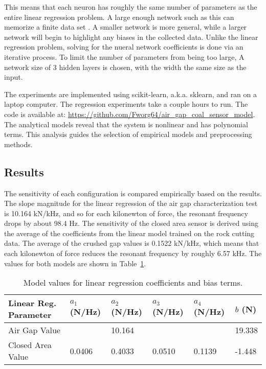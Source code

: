 This means that each neuron has roughly the same number of parameters as the entire linear regression problem.
A large enough network such as this can memorize a finite data set \cite{AroraBMM16}.
A smaller network is more general, while a larger network will begin to highlight any biases in the collected data.
Unlike the linear regression problem, solving for the nueral network coefficients is done via an iterative process.
To limit the number of parameters from being too large,
A network size of 3 hidden layers is chosen, with the width the same size as the input. 

The experiments are implemented using scikit-learn, a.k.a. sklearn, \cite{JMLR:v12:pedregosa11a} 
and ran on a laptop computer. The regression experiments take a couple hours to run.
The code is available at: \url{https://github.com/Fworg64/air_gap_coal_sensor_model}.
The analytical models reveal that the system is nonlinear and has polynomial terms.
This analysis guides the selection of empirical models and preprocessing methods.

\subsection{Results}

The sensitivity of each configuration is compared empirically based on the results.
The slope magnitude for the linear regression of the air gap characterization test is
10.164 kN/kHz, and so for each kilonewton of force, the resonant frequency drops by about
98.4 Hz. The sensitivity of the closed area sensor is derived using the average of the 
coefficients from the linear model trained on the rock cutting data.
The average of the crushed gap values is 0.1522 kN/kHz, which means that each kilonewton of force
reduces the resonant frequency by roughly 6.57 kHz.
The values for both models are shown in Table~\ref{tab:lin}. 

\begin{table}[b]
\centering
\caption{Model values for linear regression coefficients and bias terms.}
\label{tab:lin}
\begin{tabular}{|l|l|l|l|l|l|} 
\hline
Linear Reg. Parameter & $a_1$ (N/Hz) & $a_2$ (N/Hz) & $a_3$ (N/Hz)  & $a_4$ (N/Hz) & $b$ (N)     \\ \hline
Air Gap Value         & & 10.164 &  &  &  19.338  \\ \hline
Closed Area Value             & 0.0406 & 0.4033 & 0.0510 & 0.1139 &  -1.448  \\ \hline
\end{tabular}
\end{table}

